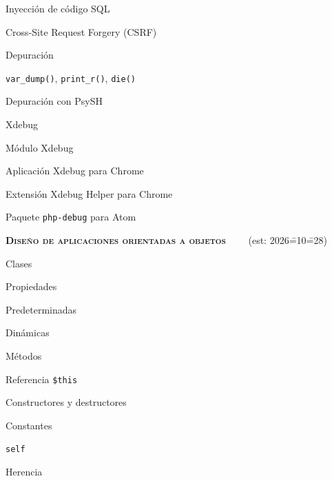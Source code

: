 \begin{longenum}
\begin{longenum}
\begin{longenum}
            \item Inyección de código SQL
            \item Cross-Site Request Forgery (CSRF)
        \end{longenum}
        \item Depuración
        \begin{longenum}
            \item \texttt{var\_dump()}, \texttt{print\_r()}, \texttt{die()}
            \item Depuración con PsySH
            \item Xdebug \opcional\
            \begin{longenum}
                \item Módulo Xdebug
                \item Aplicación Xdebug para Chrome
                \item Extensión Xdebug Helper para Chrome
                \item Paquete \texttt{php-debug} para Atom
            \end{longenum}
        \end{longenum}
    \end{longenum}
    \item \textbf{\textsc{Diseño de aplicaciones orientadas a objetos}} \ \ \ \ (est: 2026\==10\==28)
    \begin{longenum}
        \item Clases
        \item Propiedades
        \begin{longenum}
            \item Predeterminadas
            \item Dinámicas
        \end{longenum}
        \item Métodos
        \begin{longenum}
            \item Referencia \texttt{\$this}
            \item Constructores y destructores
        \end{longenum}
        \item Constantes
        \begin{longenum}
            \item \texttt{self}
        \end{longenum}
        \item Herencia
        \begin{longenum}

\end{longenum}
\end{longenum}
\end{longenum}
